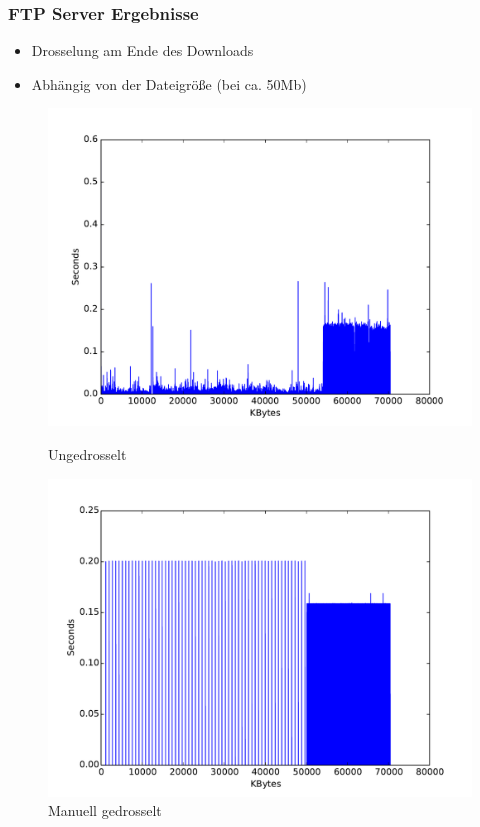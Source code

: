 \documentclass[handout]{beamer}
\begin{document}
\begin{frame}
\frametitle{FTP Server Ergebnisse}
\begin{itemize}
\item Drosselung am Ende des Downloads
\item Abhängig von der Dateigröße (bei ca. 50Mb)
\end{itemize}
\begin{figure}
\centering
\begin{minipage}[t]{0.4\linewidth}
			\centering
			\includegraphics[width=\linewidth]{images/seconds_ftp_unthrottled.pdf}
			\caption{Ungedrosselt}
\end{minipage}
\begin{minipage}[t]{0.4\linewidth}
			\centering
			\includegraphics[width=\linewidth]{images/seconds_ftp_2.pdf}
			\caption{Manuell gedrosselt}
\end{minipage}
\end{figure}
\end{frame}
\end{document}
